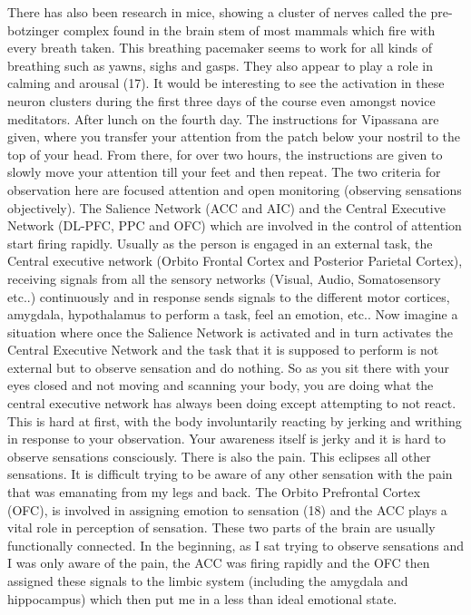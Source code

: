 \documentclass{article}
\begin{document}
There has also been research in mice, showing a cluster of nerves called the pre-botzinger complex found in the brain stem of most mammals which fire with every breath taken. This breathing pacemaker seems to work for all kinds of breathing such as yawns, sighs and gasps. They also appear to play a role in calming and arousal (17). It would be interesting to see the activation in these neuron clusters during the first three days of the course even amongst novice meditators.
After lunch on the fourth day. The instructions for Vipassana are given, where you transfer your attention from the patch below your nostril to the top of your head. From there, for over two hours, the instructions are given to slowly move your attention till your feet and then repeat. The two criteria for observation here are focused attention and open monitoring (observing sensations objectively).
The Salience Network (ACC and AIC) and the Central Executive Network (DL-PFC, PPC and OFC) which are involved in the control of attention start firing rapidly. Usually as the person is engaged in an external task, the Central executive network (Orbito Frontal Cortex and Posterior Parietal Cortex), receiving signals from all the sensory networks (Visual, Audio, Somatosensory etc..) continuously and in response sends signals to the different motor cortices, amygdala, hypothalamus to perform a task, feel an emotion, etc..
Now imagine a situation where once the Salience Network is activated and in turn activates the Central Executive Network and the task that it is supposed to perform is not external but to observe sensation and do nothing. So as you sit there with your eyes closed and not moving and scanning your body, you are doing what the central executive network has always been doing except attempting to not react.
This is hard at first, with the body involuntarily reacting by jerking and writhing in response to your observation. Your awareness itself is jerky and it is hard to observe sensations consciously.
There is also the pain. This eclipses all other sensations. It is difficult trying to be aware of any other sensation with the pain that was emanating from my legs and back. The Orbito Prefrontal Cortex (OFC), is involved in assigning emotion to sensation (18) and the ACC plays a vital role in perception of sensation. These two parts of the brain are usually functionally connected. In the beginning, as I sat trying to observe sensations and I was only aware of the pain, the ACC was firing rapidly and the OFC then assigned these signals to the limbic system (including the amygdala and hippocampus) which then put me in a less than ideal emotional state.
\end{document}
